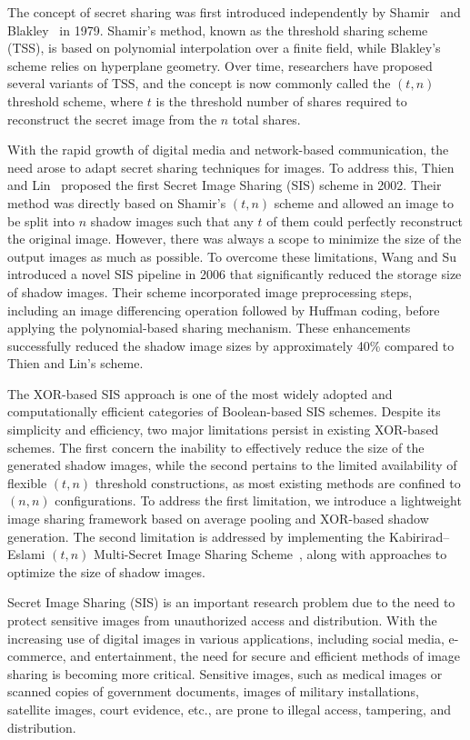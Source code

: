 The concept of secret sharing was first introduced independently by Shamir~\cite{shamir1979share} and Blakley~\cite{blakley1979} in 1979. Shamir's method, known as the threshold sharing scheme (TSS), is based on polynomial interpolation over a finite field, while Blakley's scheme relies on hyperplane geometry. Over time, researchers have proposed several variants of TSS, and the concept is now commonly called the $(t, n)$ threshold scheme, where $t$ is the threshold number of shares required to reconstruct the secret image from the $n$ total shares.
 
With the rapid growth of digital media and network-based communication, the need arose to adapt secret sharing techniques for images. To address this, Thien and Lin~\cite{thien2002secret} proposed the first Secret Image Sharing (SIS) scheme in 2002. Their method was directly based on Shamir's $(t, n)$ scheme and allowed an image to be split into $n$ shadow images such that any $t$ of them could perfectly reconstruct the original image. However, there was always a scope to minimize the size of the output images as much as possible. To overcome these limitations, Wang and Su~\cite{wang2006secret} introduced a novel SIS pipeline in 2006 that significantly reduced the storage size of shadow images. Their scheme incorporated image preprocessing steps, including an image differencing operation followed by Huffman coding, before applying the polynomial-based sharing mechanism. These enhancements successfully reduced the shadow image sizes by approximately 40\% compared to Thien and Lin's scheme.
 
The XOR-based SIS approach is one of the most widely adopted and computationally efficient categories of Boolean-based SIS schemes. Despite its simplicity and efficiency, two major limitations persist in existing XOR-based schemes. The first concern the inability to effectively reduce the size of the generated shadow images, while the second pertains to the limited availability of flexible $(t, n)$ threshold constructions, as most existing methods are confined to $(n, n)$ configurations. To address the first limitation, we introduce a {lightweight image sharing framework based on average pooling and XOR-based shadow generation}. The second limitation is addressed by implementing the Kabirirad--Eslami $(t, n)$ Multi-Secret Image Sharing Scheme~\cite{kabirirad2018t}, along with approaches to optimize the size of shadow images.
  
Secret Image Sharing (SIS) is an important research problem due to the need to protect sensitive images from unauthorized access and distribution. With the increasing use of digital images in various applications, including social media, e-commerce, and entertainment, the need for secure and efficient methods of image sharing is becoming more critical. Sensitive images, such as medical images or scanned copies of government documents, images of military installations, satellite images, court evidence, etc., are prone to illegal access, tampering, and distribution.
 
